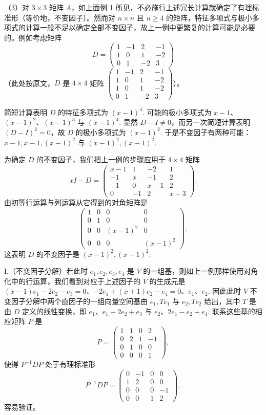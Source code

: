\begin{example}
（3）对 \(3 \times 3\) 矩阵 \(A\)，如上面例 1 所见，不必施行上述冗长计算就确定了有理标准形（等价地，不变因子）。然而对 \(n \times n\) 且 \(n \geq 4\) 的矩阵，特征多项式与极小多项式的计算一般不足以确定全部不变因子，故上一例中更繁复的计算可能是必要的。例如考虑矩阵
\[
D = \begin{pmatrix} 1 & -1 & 2 & -1 \\ 1 & 0 & 1 & -2 \\ 0 & 1 & -2 & 3 \end{pmatrix}
\]
（此处按原文，\(D\) 是 \(4 \times 4\) 矩阵 \(\begin{pmatrix} 1 & -1 & 2 & -1 \\ 1 & 0 & 1 & -2 \\ 1 & 0 & 1 & -2 \\ 0 & 1 & -2 & 3\end{pmatrix}\)）。

简短计算表明 \(D\) 的特征多项式为 \((x-1)^4\). 可能的极小多项式为 \(x-1\)、\((x-1)^2\)、\((x-1)^3\) 与 \((x-1)^4\). 显然 \(D-I \neq 0\)，而另一次简短计算表明 \((D-I)^2 = 0\)，故 \(D\) 的极小多项式为 \((x-1)^2\). 于是不变因子有两种可能：\(x-1, x-1, (x-1)^2\) 与 \((x-1)^2, (x-1)^2\).

为确定 \(D\) 的不变因子，我们把上一例的步骤应用于 \(4 \times 4\) 矩阵
\[
xI-D = \begin{pmatrix} x-1 & 1 & -2 & 1 \\ -1 & x & -1 & 2 \\ -1 & 0 & x-1 & 2 \\ 0 & -1 & 2 & x-3 \end{pmatrix}.
\]
由初等行运算与列运算从它得到的对角矩阵是
\[
\begin{pmatrix} 1 & 0 & 0 & 0 \\ 0 & 1 & 0 & 0 \\ 0 & 0 & (x-1)^2 & 0 \\ 0 & 0 & 0 & (x-1)^2 \end{pmatrix},
\]
这表明 \(D\) 的不变因子是 \((x-1)^2, (x-1)^2\).

\noindent I.（不变因子分解）若此时 \(e_1, e_2, e_3, e_4\) 是 \(V\) 的一组基，则如上一例那样使用对角化中的行运算，我们看到对应于上述因子的 \(V\) 的生成元是 \((x-1)e_1-2e_2-e_3 = 0\)、\(-2e_1+(x+1)e_2-e_4 = 0\)、\(e_1\)、\(e_2\). 因此此时 \(V\) 不变因子分解中两个直因子的一组向量空间基由 \(e_1, Te_1\) 与 \(e_2, Te_2\) 给出，其中 \(T\) 是由 \(D\) 定义的线性变换，即 \(e_1\)、\(e_1+2e_2+e_3\) 与 \(e_2\)、\(2e_1-e_2+e_4\). 联系这些基的相应矩阵 \(P\) 是
\[
P = \begin{pmatrix} 1 & 1 & 0 & 2 \\ 0 & 2 & 1 & -1 \\ 0 & 1 & 0 & 0 \\ 0 & 0 & 0 & 1 \end{pmatrix},
\]
使得 \(P^{-1}DP\) 处于有理标准形
\[
P^{-1}DP = \begin{pmatrix} 0 & -1 & 0 & 0 \\ 1 & 2 & 0 & 0 \\ 0 & 0 & 0 & -1 \\ 0 & 0 & 1 & 2 \end{pmatrix},
\]
容易验证。


\end{example}

